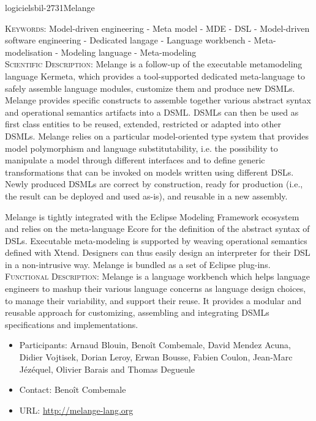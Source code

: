 \documentclass{ra2018}
\begin{document}
 \begin{module}{logiciels}{bil-2731}{Melange}

   \textsc{Keywords:} Model-driven engineering - Meta model - MDE - DSL - Model-driven software engineering - Dedicated langage - Language workbench - Meta-modelisation - Modeling language - Meta-modeling \\ 


    \textsc{Scientific Description:} Melange is a follow-up of the executable metamodeling language Kermeta, which provides a tool-supported dedicated meta-language to safely assemble language modules, customize them and produce new DSMLs. Melange provides specific constructs to assemble together various abstract syntax and operational semantics artifacts into a DSML. DSMLs can then be used as first class entities to be reused, extended, restricted or adapted into other DSMLs. Melange relies on a particular model-oriented type system that provides model polymorphism and language substitutability, i.e. the possibility to manipulate a model through different interfaces and to define generic transformations that can be invoked on models written using different DSLs. Newly produced DSMLs are correct by construction, ready for production (i.e., the result can be deployed and used as-is), and reusable in a new assembly.

Melange is tightly integrated with the Eclipse Modeling Framework ecosystem and relies on the meta-language Ecore for the definition of the abstract syntax of DSLs. Executable meta-modeling is supported by weaving operational semantics defined with Xtend. Designers can thus easily design an interpreter for their DSL in a non-intrusive way. Melange is bundled as a set of Eclipse plug-ins.\\

 \textsc{Functional Description:}  Melange is a language workbench which helps language engineers to mashup their various language concerns as language design choices, to manage their variability, and support their reuse. It provides a modular and reusable approach for customizing, assembling and integrating DSMLs specifications and implementations.\\

   \begin{itemize}
      \item Participants: Arnaud Blouin, Benoît Combemale, David Mendez Acuna, Didier Vojtisek, Dorian Leroy, Erwan Bousse, Fabien Coulon, Jean-Marc Jézéquel, Olivier Barais and Thomas Degueule
      \item Contact: Benoît Combemale
      \item URL: \url{http://melange-lang.org}
   \end{itemize}

 \end{module}
\end{document}
